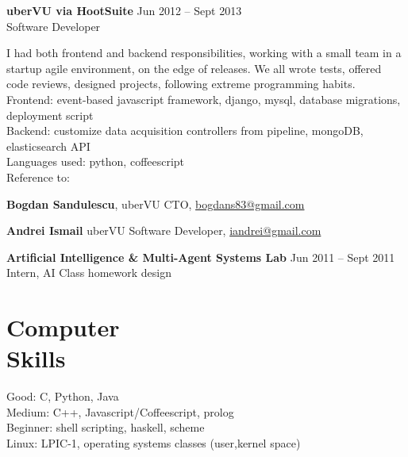 \documentclass[margin,line]{resume}
\begin{document}
\begin{resume}
	\vspace{1.2mm}\textbf{uberVU via HootSuite}
		\hfill Jun 2012 -- Sept 2013\vspace{1mm}\\
		Software Developer\vspace{1.2mm}\\
    {\fontsize{2.65mm}{1em}\selectfont
      I had both frontend and backend responsibilities, working with a small team in a startup agile environment, on the edge of releases. We all wrote tests, offered code reviews, designed projects, following extreme programming habits.\vspace{1.2mm}\\
      Frontend: event-based javascript framework, django, mysql, database migrations, deployment script\vspace{1.2mm}\\
      Backend: customize data acquisition controllers from pipeline, mongoDB, elasticsearch API\vspace{1.2mm}\\
      Languages used: python, coffeescript\vspace{1.2mm}\\
      Reference to:
      \begin{list2}
          \item \textbf{Bogdan Sandulescu}, uberVU CTO, \href{mailto:bogdans83@gmail.com}{bogdans83@gmail.com}
          \item \textbf{Andrei Ismail} uberVU Software Developer, \href{mailto:iandrei@gmail.com}{iandrei@gmail.com}
      \end{list2}
    }

	\vspace{1.2mm}\textbf{Artificial Intelligence \& Multi-Agent Systems Lab}
		\hfill Jun 2011 -- Sept 2011\vspace{1mm}\\
		Intern, AI Class homework design
    \section{\mysidestyle Computer\\Skills}

    Good: C, Python, Java							\\
    Medium: C++, Javascript/Coffeescript, prolog	\\
    Beginner: shell scripting, haskell, scheme					\\
	Linux: LPIC-1, operating systems classes (user,kernel space)


\end{resume}
\end{document}
